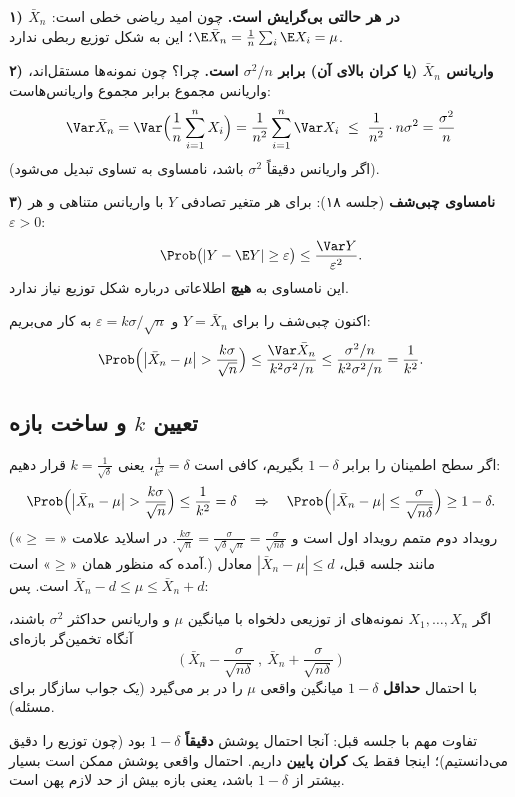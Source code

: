 \textbf{۱) $\bar X_n$ در هر حالتی بی‌گرایش است.} چون امید ریاضی خطی است: $\E\bar X_n=\frac1n\sum_i\E X_i=\mu$؛ این به شکل توزیع ربطی ندارد.

\textbf{۲) واریانس $\bar X_n$ (یا کران بالای آن) برابر $\sigma^2/n$ است.} چرا؟ چون نمونه‌ها مستقل‌اند، واریانس مجموع برابر مجموع واریانس‌هاست:
\[
\Var\bar X_n=\Var\Big(\frac1n\sum_{i=1}^nX_i\Big)=\frac{1}{n^2}\sum_{i=1}^n\Var X_i\ \le\ \frac{1}{n^2}\cdot n\sigma^2=\frac{\sigma^2}{n}
\]
(اگر واریانس دقیقاً $\sigma^2$ باشد، نامساوی به تساوی تبدیل می‌شود).

\textbf{۳) نامساوی چبی‌شف} (جلسه ۱۸): برای هر متغیر تصادفی $Y$ با واریانس متناهی و هر $\varepsilon>0$:
\[
\Prob\big(|Y-\E Y|\ge\varepsilon\big)\le\frac{\Var Y}{\varepsilon^2}.
\]
این نامساوی به \textbf{هیچ} اطلاعاتی درباره شکل توزیع نیاز ندارد.

اکنون چبی‌شف را برای $Y=\bar X_n$ و $\varepsilon=k\sigma/\sqrt n$ به کار می‌بریم:
\[
\Prob\Big(\big|\bar X_n-\mu\big|>\frac{k\sigma}{\sqrt n}\Big)\le\frac{\Var\bar X_n}{k^2\sigma^2/n}\le\frac{\sigma^2/n}{k^2\sigma^2/n}=\frac{1}{k^2}.
\]

\subsection{تعیین $k$ و ساخت بازه}
اگر سطح اطمینان  را برابر $1-\delta$ بگیریم، کافی است $\frac1{k^2}=\delta$، یعنی $k=\frac{1}{\sqrt\delta}$ قرار دهیم:
\[
\Prob\Big(\big|\bar X_n-\mu\big|>\frac{k\sigma}{\sqrt n}\Big)\le\frac1{k^2}=\delta
\quad\Rightarrow\quad
\Prob\Big(\big|\bar X_n-\mu\big|\le\frac{\sigma}{\sqrt{n\delta}}\Big)\ge1-\delta .
\]
(رویداد دوم متمم رویداد اول است و $\frac{k\sigma}{\sqrt n}=\frac{\sigma}{\sqrt\delta\sqrt n}=\frac{\sigma}{\sqrt{n\delta}}$. در اسلاید علامت «$\ge=$» آمده که منظور همان «$\ge$» است.) مانند جلسه قبل، $|\bar X_n-\mu|\le d$ معادل $\bar X_n-d\le\mu\le\bar X_n+d$ است. پس:

\begin{theorem}
اگر $X_1,\ldots,X_n$ نمونه‌های  از توزیعی دلخواه با میانگین $\mu$ و واریانس حداکثر $\sigma^2$ باشند، آنگاه تخمین‌گر بازه‌ای
\[
\Big(\ \bar X_n-\frac{\sigma}{\sqrt{n\delta}}\ ,\ \bar X_n+\frac{\sigma}{\sqrt{n\delta}}\ \Big)
\]
با احتمال \textbf{حداقل} $1-\delta$ میانگین واقعی $\mu$ را در بر می‌گیرد (یک جواب سازگار برای مسئله).
\end{theorem}

تفاوت مهم با جلسه قبل: آنجا احتمال پوشش \textbf{دقیقاً} $1-\delta$ بود (چون توزیع را دقیق می‌دانستیم)؛ اینجا فقط یک \textbf{کران پایین} داریم. احتمال واقعی پوشش ممکن است بسیار بیشتر از $1-\delta$ باشد، یعنی بازه بیش از حد لازم پهن است.

